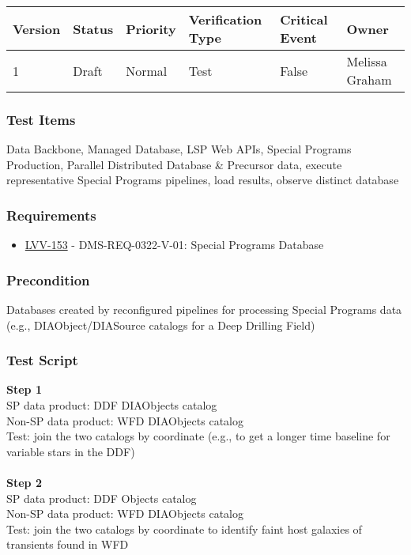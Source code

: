 \begin{longtable}[]{@{}llllll@{}}
\toprule
Version & Status & Priority & Verification Type & Critical Event &
Owner\tabularnewline
\midrule
\endhead
1 & Draft & Normal & Test & False & Melissa Graham\tabularnewline
\bottomrule
\end{longtable}

\hypertarget{test-items-70}{%
\subsubsection{Test Items}\label{test-items-70}}

Data Backbone, Managed Database, LSP Web APIs, Special Programs
Production, Parallel Distributed Database \& Precursor data, execute
representative Special Programs pipelines, load results, observe
distinct database

\hypertarget{requirements-71}{%
\subsubsection{Requirements}\label{requirements-71}}

\begin{itemize}
\tightlist
\item
  \href{https://jira.lsstcorp.org/browse/LVV-153}{LVV-153} -
  DMS-REQ-0322-V-01: Special Programs Database
\end{itemize}

\hypertarget{precondition-13}{%
\subsubsection{Precondition}\label{precondition-13}}

Databases created by reconfigured pipelines for processing Special
Programs data (e.g., DIAObject/DIASource catalogs for a Deep Drilling
Field)

\hypertarget{test-script-71}{%
\subsubsection{Test Script}\label{test-script-71}}

\textbf{Step 1}\\
SP data product: DDF DIAObjects catalog\\
Non-SP data product: WFD DIAObjects catalog\\
Test: join the two catalogs by coordinate (e.g., to get a longer time
baseline for variable stars in the DDF)\\
~\\
\textbf{Step 2}\\
SP data product: DDF Objects catalog\\
Non-SP data product: WFD DIAObjects catalog\\
Test: join the two catalogs by coordinate to identify faint host
galaxies of transients found in WFD\\
~\\

